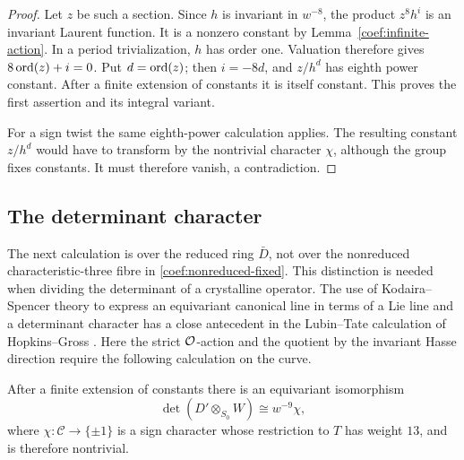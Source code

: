 \begin{proof}
Let \(z\) be such a section.  Since \(h\) is invariant in \(w^{-8}\),
the product \(z^8h^i\) is an invariant Laurent function.
It is a nonzero constant by Lemma~\ref{coef:infinite-action}.
In a period trivialization, \(h\) has order one.
Valuation therefore gives \(8\operatorname{ord}(z)+i=0\).
Put \(d=\operatorname{ord}(z)\); then \(i=-8d\), and \(z/h^d\) has eighth
power constant.  After a finite extension of constants it is itself
constant.  This proves the first assertion and its integral variant.

For a sign twist the same eighth-power calculation applies.
The resulting constant \(z/h^d\) would have to transform by the
nontrivial character \(\chi\), although the group fixes constants.
It must therefore vanish, a contradiction.
\end{proof}

\subsection{The determinant character}

The next calculation is over the reduced ring \(\bar D\), not over
the nonreduced characteristic-three fibre in
\eqref{coef:nonreduced-fixed}.  This distinction is needed when
dividing the determinant of a crystalline operator.
The use of Kodaira--Spencer theory to express an equivariant
canonical line in terms of a Lie line and a determinant character
has a close antecedent in the Lubin--Tate calculation of
Hopkins--Gross \cite[Section~1.2 and Corollary~3]{HopkinsGross}.
Here the strict \(\mathcal O\)-action and the quotient by the invariant
Hasse direction require the following calculation on the curve.

\begin{lemma}\label{coef:determinant}
After a finite extension of constants there is an equivariant
isomorphism
\begin{equation}\label{coef:determinant-formula}
 \det(D'\otimes_{S_0}W)\cong w^{-9}\chi,
\end{equation}
where \(\chi:\mathcal C\to\{\pm1\}\) is a sign character whose
restriction to \(T\) has weight \(13\), and is therefore nontrivial.
\end{lemma}

